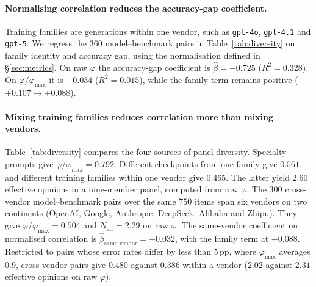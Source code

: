 \paragraph{Normalising correlation reduces the accuracy-gap coefficient.}
Training families are generations within one vendor, such as \texttt{gpt-4o}, \texttt{gpt-4.1}
and \texttt{gpt-5}. We regress the $360$ model--benchmark pairs in Table~\ref{tab:diversity} on
family identity and accuracy gap, using the normalisation defined in \S\ref{sec:metrics}.
On raw $\varphi$ the accuracy-gap coefficient is $\hat\beta = -0.725$ ($R^2 = 0.328$).
On $\varphi/\varphi_{\max}$ it is $-0.034$ ($R^2 = 0.015$), while the family term remains
positive ($+0.107 \to +0.088$).

\begin{table}[t]\centering\small
\setlength{\tabcolsep}{6pt}
\renewcommand{\arraystretch}{1.02}
\caption{\textbf{Four sources of panel diversity.} Normalised correlation $\varphi/\varphi_{\max}$ accounts for unequal error rates. Rows vary prompts, checkpoints, training families and vendors; $n$ counts model--benchmark pairs. $N_{\text{eff}}^{9}$ is computed from raw $\varphi$.}
\label{tab:diversity}

\end{table}

\paragraph{Mixing training families reduces correlation more than mixing vendors.}
Table~\ref{tab:diversity} compares the four sources of panel diversity.
Specialty prompts give $\varphi/\varphi_{\max} = 0.792$. Different checkpoints from one family
give $0.561$, and different training families within one vendor give $0.465$.
The latter yield $2.60$ effective opinions in a nine-member panel, computed from raw $\varphi$.
The $300$ cross-vendor model--benchmark pairs over the same $750$ items span six vendors on two
continents (OpenAI, Google, Anthropic, DeepSeek, Alibaba and Zhipu).
They give $\varphi/\varphi_{\max} = 0.504$ and $N_{\text{eff}} = 2.29$ on raw $\varphi$.
The same-vendor coefficient on normalised correlation is $\hat\beta_{\text{same vendor}} = -0.032$,
with the family term at $+0.088$. Restricted to pairs whose error rates differ by less than
$5$\,pp, where $\varphi_{\max}$ averages $0.9$, cross-vendor pairs give $0.480$ against
$0.386$ within a vendor ($2.02$ against $2.31$ effective opinions on raw $\varphi$).



